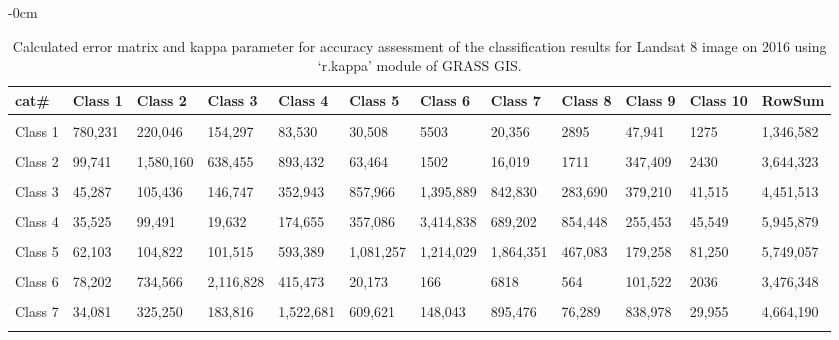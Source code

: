 \documentclass[analytics,article,accept,pdftex,moreauthors]{Definitions/mdpi}
\begin{document}
\begin{table}[H] 

    \caption{Calculated error matrix and kappa parameter for accuracy assessment of the classification results for Landsat 8 image on 2016 using `r.kappa' module of GRASS GIS.}%
    \begin{adjustwidth}{-\extralength}{0cm}
 	\begin{tabularx}{\fulllength}{lllllllllllL}
    \toprule
        \textbf{cat\#} & \textbf{Class 1} & \textbf{Class 2} & \textbf{Class 3} & \textbf{Class 4} & \textbf{Class 5} & \textbf{Class 6} & \textbf{Class 7} & \textbf{Class 8} & \textbf{Class 9} & \textbf{Class 10} & \textbf{RowSum} \\ \hline
      &&&&&&&&&&&\\[-2ex]
        Class 1 & 780,231 & 220,046 & 154,297 & 83,530 & 30,508 & 5503 & 20,356 & 2895 & 47,941 & 1275 & 1,346,582 \\ \hline
      &&&&&&&&&&&\\[-2ex]
        Class 2 & 99,741 & 1,580,160 & 638,455 & 893,432 & 63,464 & 1502 & 16,019 & 1711 & 347,409 & 2430 & 3,644,323 \\ \hline
      &&&&&&&&&&&\\[-2ex]
        Class 3 & 45,287 & 105,436 & 146,747 & 352,943 & 857,966 & 1,395,889 & 842,830 & 283,690 & 379,210 & 41,515 & 4,451,513 \\ \hline
      &&&&&&&&&&&\\[-2ex]
        Class 4 & 35,525 & 99,491 & 19,632 & 174,655 & 357,086 & 3,414,838 & 689,202 & 854,448 & 255,453 & 45,549 & 5,945,879 \\ \hline
      &&&&&&&&&&&\\[-2ex]
        Class 5 & 62,103 & 104,822 & 101,515 & 593,389 & 1,081,257 & 1,214,029 & 1,864,351 & 467,083 & 179,258 & 81,250 & 5,749,057 \\ \hline
      &&&&&&&&&&&\\[-2ex]
        Class 6 & 78,202 & 734,566 & 2,116,828 & 415,473 & 20,173 & 166 & 6818 & 564 & 101,522 & 2036 & 3,476,348 \\ \hline
      &&&&&&&&&&&\\[-2ex]
        Class 7 & 34,081 & 325,250 & 183,816 & 1,522,681 & 609,621 & 148,043 & 895,476 & 76,289 & 838,978 & 29,955 & 4,664,190 \\ \hline
      &&&&&&&&&&&\\[-2ex]

\end{tabularx}
\end{adjustwidth}
\end{table}
\end{document}

